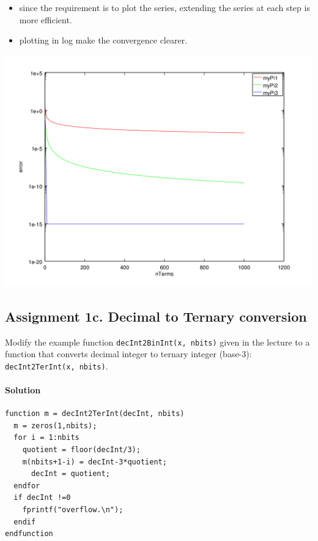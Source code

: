 \documentclass[12pt,a4paper,hidelinks,fleqn]{article}            %
\begin{document}
\begin{itemize}
\item since the requirement is to plot the series, extending the series at each step is more efficient.
\item plotting in log make the convergence clearer.
\end{itemize}

\begin{center}
\includegraphics[scale=0.7]{pichart}
\end{center}

\subsection*{Assignment 1c. Decimal to Ternary conversion}
Modify the example function \verb=decInt2BinInt(x, nbits)= given in the lecture to  
a function that converts decimal integer to ternary integer (base-3): \verb=decInt2TerInt(x, nbits)=.

\paragraph{Solution}
\begin{verbatim}
function m = decInt2TerInt(decInt, nbits)
  m = zeros(1,nbits);
  for i = 1:nbits
    quotient = floor(decInt/3);
    m(nbits+1-i) = decInt-3*quotient;
	  decInt = quotient;
  endfor
  if decInt !=0
    fprintf("overflow.\n");
  endif
endfunction
\end{verbatim}
\end{document}
